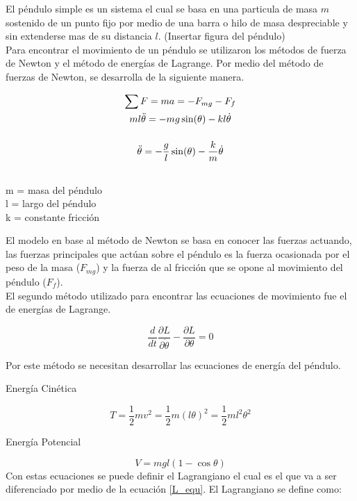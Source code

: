 El péndulo simple es un sistema el cual se basa en una particula de masa $m$ sostenido de un punto fijo por medio de una barra o hilo de masa despreciable y sin extenderse mas de su distancia $l$. (Insertar figura del péndulo)\\

Para encontrar el movimiento de un péndulo se utilizaron los métodos de fuerza de Newton y el método de energías de Lagrange. Por medio del método de fuerzas de Newton, se desarrolla de la siguiente manera.
\begin{large}
\begin{gather*}
\sum F = ma = -F_{mg} - F_f \\ \bigskip
ml\ddot{\theta} = -mg\sin(\theta) - kl\dot{\theta} \\ \bigskip
\ddot{\theta} = -\dfrac{g}{l}\sin(\theta) - \dfrac{k}{m}\dot{\theta} \\
\end{gather*} 
\end{large}
\begin{flushright}
\begin{small}
m = masa del péndulo\\
l = largo del péndulo\\
k = constante fricción\\
\end{small}
\end{flushright}

El modelo en base al método de Newton se basa en conocer las fuerzas actuando, las fuerzas principales que actúan sobre el péndulo es la fuerza ocasionada por el peso de la masa ($F_{mg}$) y la fuerza de al fricción que se opone al movimiento del péndulo ($F_f$).\\

El segundo método utilizado para encontrar las ecuaciones de movimiento fue el de energías de Lagrange.
\begin{large}
\begin{equation} \label{L_equ}
\dfrac{d}{dt} \dfrac{\partial L}{\partial \dot{\theta}} - \dfrac{\partial L}{\partial\theta} = 0
\end{equation}
\end{large}
Por este método se necesitan desarrollar las ecuaciones de energía del péndulo.\\
\begin{flushleft}
{\large Energía Cinética}
\end{flushleft}
\begin{equation} \label{T_equ}
T = \frac{1}{2}mv^2 = \frac{1}{2}m(l\theta)^2 = \frac{1}{2}ml^2\theta^2 
\end{equation}
\begin{flushleft}
{\large Energía Potencial}
\end{flushleft}
\begin{equation} \label{V_equ}
V = mgl(1-\cos \theta)
\end{equation}
Con estas ecuaciones se puede definir el Lagrangiano el cual es el que va a ser diferenciado por medio de la ecuación \ref{L_equ}. El Lagrangiano se define como:

